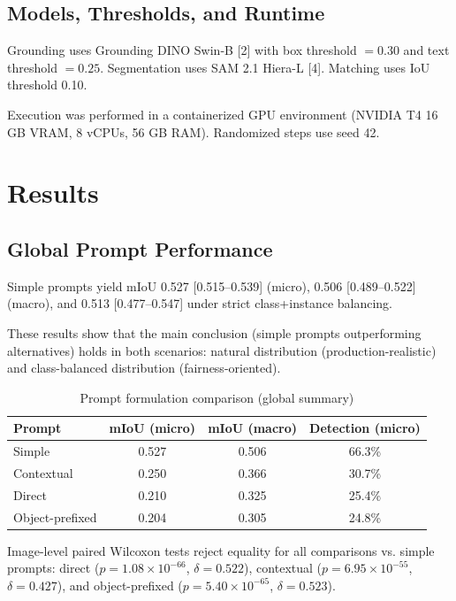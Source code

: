 \documentclass[pdflatex,sn-mathphys-num]{sn-jnl}
\begin{document}
\subsection{Models, Thresholds, and Runtime}

Grounding uses Grounding DINO Swin-B [2] with box threshold $=0.30$ and text threshold $=0.25$. Segmentation uses SAM 2.1 Hiera-L [4]. Matching uses IoU threshold 0.10.

Execution was performed in a containerized GPU environment (NVIDIA T4 16 GB VRAM, 8 vCPUs, 56 GB RAM). Randomized steps use seed 42.

\section{Results}

\subsection{Global Prompt Performance}

Simple prompts yield mIoU 0.527 [0.515--0.539] (micro), 0.506 [0.489--0.522] (macro), and 0.513 [0.477--0.547] under strict class+instance balancing.

These results show that the main conclusion (simple prompts outperforming alternatives) holds in both scenarios: natural distribution (production-realistic) and class-balanced distribution (fairness-oriented).

\begin{table}[h]
\caption{Prompt formulation comparison (global summary)}
\label{tab:prompt-comparison}
\centering
\begin{tabular}{lccc}
\toprule
Prompt & mIoU (micro) & mIoU (macro) & Detection (micro) \\
\midrule
Simple & 0.527 & 0.506 & 66.3\% \\
Contextual & 0.250 & 0.366 & 30.7\% \\
Direct & 0.210 & 0.325 & 25.4\% \\
Object-prefixed & 0.204 & 0.305 & 24.8\% \\
\bottomrule
\end{tabular}
\end{table}

Image-level paired Wilcoxon tests reject equality for all comparisons vs. simple prompts: direct ($p=1.08\times10^{-66}$, $\delta=0.522$), contextual ($p=6.95\times10^{-55}$, $\delta=0.427$), and object-prefixed ($p=5.40\times10^{-65}$, $\delta=0.523$).
\end{document}
